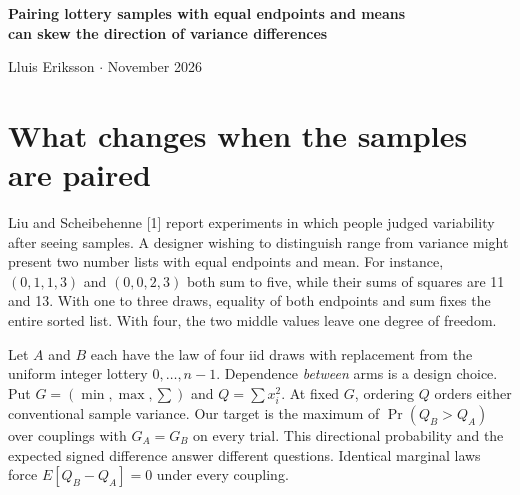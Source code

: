 \documentclass[10pt]{article}
\begin{document}
\begin{center}
{\Large\bfseries Pairing lottery samples with equal endpoints and means\\[2pt] can skew the direction of variance differences}\par
\vspace{5pt}Lluis Eriksson \quad$\cdot$ November 2026
\end{center}

\begin{abstract}
When two samples have the same minimum, maximum and mean, four draws suffice for their sample variances to differ. How often can a paired design produce a higher variance in its second arm when both arms draw from the very same lottery? For four independent uniform draws per arm from $0,\ldots,n-1$, the largest probability over joint designs preserving all three controls on every trial is $1-(8n^3-32n^2+67n-54)/n^4$ for $n\ge2$. This probability tends to one although the signed variance difference has expectation zero. For bounded absolutely continuous lotteries the supremum is one and cannot be attained. We also enumerate distinct integer lotteries with identical expected sample ranges at every sample size and provide complete trial schedules for two discrete designs. The conclusions concern the way trials are paired, without assuming any behavioral response.
\end{abstract}

\section*{What changes when the samples are paired}
Liu and Scheibehenne [1] report experiments in which people judged variability after seeing samples. A designer wishing to distinguish range from variance might present two number lists with equal endpoints and mean. For instance, $(0,1,1,3)$ and $(0,0,2,3)$ both sum to five, while their sums of squares are 11 and 13. With one to three draws, equality of both endpoints and sum fixes the entire sorted list. With four, the two middle values leave one degree of freedom.

Let $A$ and $B$ each have the law of four iid draws with replacement from the uniform integer lottery $0,\ldots,n-1$. Dependence \emph{between} arms is a design choice. Put $G=(\min,\max,\sum)$ and $Q=\sum x_i^2$. At fixed $G$, ordering $Q$ orders either conventional sample variance. Our target is the maximum of $\Pr(Q_B>Q_A)$ over couplings with $G_A=G_B$ on every trial. This directional probability and the expected signed difference answer different questions. Identical marginal laws force $E[Q_B-Q_A]=0$ under every coupling.
\end{document}
